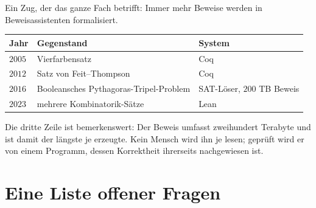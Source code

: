 \begin{forschung}
Ein Zug, der das ganze Fach betrifft: Immer mehr Beweise werden in Beweisassistenten formalisiert.

\begin{center}
{\small
\renewcommand{\arraystretch}{1.45}
\begin{tabular}{@{}P{1.6cm}P{2.6cm}P{3.6cm}@{}}
\toprule
\textbf{Jahr} & \textbf{Gegenstand} & \textbf{System}\\
\midrule
$2005$ & Vierfarbensatz & Coq\\
$2012$ & Satz von Feit--Thompson & Coq\\
$2016$ & Booleansches Pythagoras-Tripel-Problem & SAT-Löser, $200$ TB Beweis\\
$2023$ & mehrere Kombinatorik-Sätze & Lean\\
\bottomrule
\end{tabular}}
\end{center}

Die dritte Zeile ist bemerkenswert: Der Beweis umfasst zweihundert Terabyte und ist damit der längste je erzeugte. Kein Mensch wird ihn je lesen; geprüft wird er von einem Programm, dessen Korrektheit ihrerseits nachgewiesen ist.

\begin{center}
\begin{minipage}{0.88\textwidth}
\end{minipage}
\end{center}
\end{forschung}

\section{Eine Liste offener Fragen}

